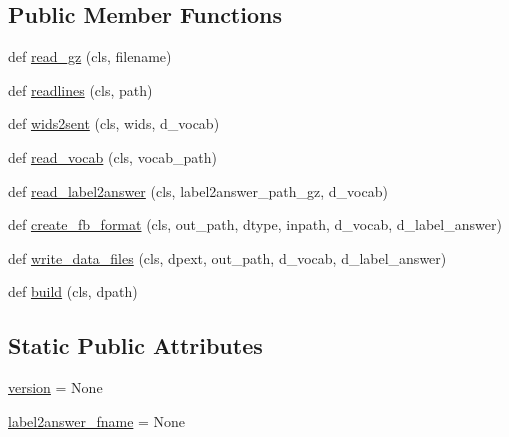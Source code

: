 \subsection*{Public Member Functions}
\begin{DoxyCompactItemize}
\item 
def \hyperlink{classparlai_1_1tasks_1_1insuranceqa_1_1build_1_1ParseInsuranceQA_a3f2322d59e42f329387912bd3d03c888}{read\+\_\+gz} (cls, filename)
\item 
def \hyperlink{classparlai_1_1tasks_1_1insuranceqa_1_1build_1_1ParseInsuranceQA_af8b1135c593e04b80b602d717a3b30d3}{readlines} (cls, path)
\item 
def \hyperlink{classparlai_1_1tasks_1_1insuranceqa_1_1build_1_1ParseInsuranceQA_afb5e7fdf077dea815bdd256c5a750069}{wids2sent} (cls, wids, d\+\_\+vocab)
\item 
def \hyperlink{classparlai_1_1tasks_1_1insuranceqa_1_1build_1_1ParseInsuranceQA_ade9a2ccdc949872bb85c31c9440d5e82}{read\+\_\+vocab} (cls, vocab\+\_\+path)
\item 
def \hyperlink{classparlai_1_1tasks_1_1insuranceqa_1_1build_1_1ParseInsuranceQA_a24c20a520141dbc602a242780281ee6d}{read\+\_\+label2answer} (cls, label2answer\+\_\+path\+\_\+gz, d\+\_\+vocab)
\item 
def \hyperlink{classparlai_1_1tasks_1_1insuranceqa_1_1build_1_1ParseInsuranceQA_a05c7792ef7e45fe67f6e964d2f73f852}{create\+\_\+fb\+\_\+format} (cls, out\+\_\+path, dtype, inpath, d\+\_\+vocab, d\+\_\+label\+\_\+answer)
\item 
def \hyperlink{classparlai_1_1tasks_1_1insuranceqa_1_1build_1_1ParseInsuranceQA_abd3ae5efba9775554d68e911fd36c840}{write\+\_\+data\+\_\+files} (cls, dpext, out\+\_\+path, d\+\_\+vocab, d\+\_\+label\+\_\+answer)
\item 
def \hyperlink{classparlai_1_1tasks_1_1insuranceqa_1_1build_1_1ParseInsuranceQA_a94f69218557d222da922e0de7f41f75a}{build} (cls, dpath)
\end{DoxyCompactItemize}
\subsection*{Static Public Attributes}
\begin{DoxyCompactItemize}
\item 
\hyperlink{classparlai_1_1tasks_1_1insuranceqa_1_1build_1_1ParseInsuranceQA_a0d836d18b0fe51bb6920e5cc743b500d}{version} = None
\item 
\hyperlink{classparlai_1_1tasks_1_1insuranceqa_1_1build_1_1ParseInsuranceQA_a43a944262ff61deb4d06c2f9af01588f}{label2answer\+\_\+fname} = None
\end{DoxyCompactItemize}


